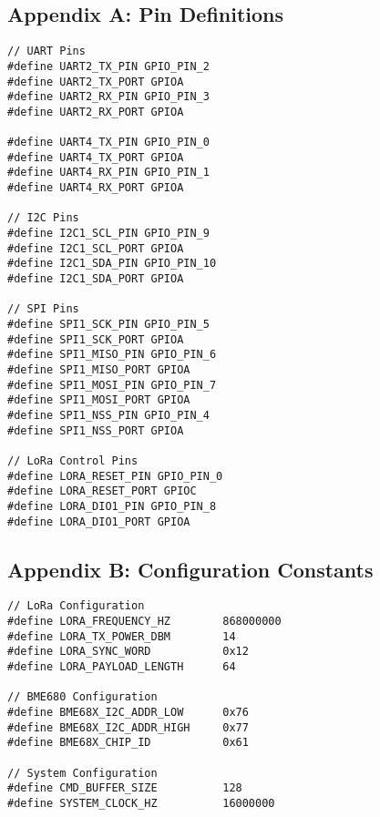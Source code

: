 \documentclass[11pt,a4paper]{article}
\begin{document}
\subsection{Appendix A: Pin Definitions}
\begin{lstlisting}[caption=Pin Definitions in main.h]
// UART Pins
#define UART2_TX_PIN GPIO_PIN_2
#define UART2_TX_PORT GPIOA
#define UART2_RX_PIN GPIO_PIN_3
#define UART2_RX_PORT GPIOA

#define UART4_TX_PIN GPIO_PIN_0
#define UART4_TX_PORT GPIOA
#define UART4_RX_PIN GPIO_PIN_1
#define UART4_RX_PORT GPIOA

// I2C Pins
#define I2C1_SCL_PIN GPIO_PIN_9
#define I2C1_SCL_PORT GPIOA
#define I2C1_SDA_PIN GPIO_PIN_10
#define I2C1_SDA_PORT GPIOA

// SPI Pins
#define SPI1_SCK_PIN GPIO_PIN_5
#define SPI1_SCK_PORT GPIOA
#define SPI1_MISO_PIN GPIO_PIN_6
#define SPI1_MISO_PORT GPIOA
#define SPI1_MOSI_PIN GPIO_PIN_7
#define SPI1_MOSI_PORT GPIOA
#define SPI1_NSS_PIN GPIO_PIN_4
#define SPI1_NSS_PORT GPIOA

// LoRa Control Pins
#define LORA_RESET_PIN GPIO_PIN_0
#define LORA_RESET_PORT GPIOC
#define LORA_DIO1_PIN GPIO_PIN_8
#define LORA_DIO1_PORT GPIOA
\end{lstlisting}

\subsection{Appendix B: Configuration Constants}
\begin{lstlisting}[caption=Configuration Constants]
// LoRa Configuration
#define LORA_FREQUENCY_HZ        868000000
#define LORA_TX_POWER_DBM        14
#define LORA_SYNC_WORD           0x12
#define LORA_PAYLOAD_LENGTH      64

// BME680 Configuration
#define BME68X_I2C_ADDR_LOW      0x76
#define BME68X_I2C_ADDR_HIGH     0x77
#define BME68X_CHIP_ID           0x61

// System Configuration
#define CMD_BUFFER_SIZE          128
#define SYSTEM_CLOCK_HZ          16000000
\end{lstlisting}
\end{document}
